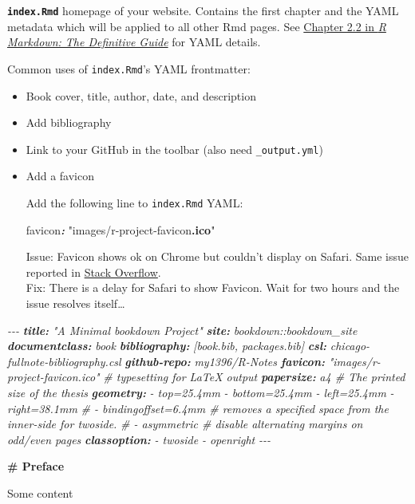 \documentclass[
  a4paper,
  twoside,
  openright]{book}
\newenvironment{Shaded}{\begin{snugshade}}{\end{snugshade}}
\newcommand{\AnnotationTok}[1]{\textcolor[rgb]{0.56,0.35,0.01}{\textbf{\textit{#1}}}}
\newcommand{\CommentTok}[1]{\textcolor[rgb]{0.56,0.35,0.01}{\textit{#1}}}
\newcommand{\FunctionTok}[1]{\textcolor[rgb]{0.13,0.29,0.53}{\textbf{#1}}}
\newcommand{\InformationTok}[1]{\textcolor[rgb]{0.56,0.35,0.01}{\textbf{\textit{#1}}}}
\newcommand{\NormalTok}[1]{#1}
\theoremstyle{definition}
\theoremstyle{definition}
\theoremstyle{definition}
\theoremstyle{definition}
\theoremstyle{remark}
\begin{document}
\textbf{\texttt{index.Rmd}} {homepage of your website}. Contains the first chapter and the YAML metadata which will be applied to all other Rmd pages. See \href{https://bookdown.org/yihui/rmarkdown/compile.html}{Chapter 2.2 in \emph{R Markdown: The Definitive Guide}} for YAML details.

Common uses of \texttt{index.Rmd}'s YAML frontmatter:

\begin{itemize}
\item
  Book cover, title, author, date, and description
\item
  Add bibliography
\item
  Link to your GitHub in the toolbar (also need \texttt{\_output.yml})
\item
  Add a favicon

  Add the following line to \texttt{index.Rmd} YAML:

\begin{Shaded}
\begin{Highlighting}[]
\NormalTok{favicon}\InformationTok{:}\NormalTok{ "images/r{-}project{-}favicon}\FunctionTok{.ico}\NormalTok{"}
\end{Highlighting}
\end{Shaded}

  Issue: Favicon shows ok on Chrome but couldn't display on Safari. Same issue reported in \href{https://stackoverflow.com/questions/66023588/r-bookdown-favicon-works-offline-but-not-online}{Stack Overflow}.\\
  Fix: There is a delay for Safari to show Favicon. Wait for two hours and the issue resolves itself\ldots{}
\end{itemize}

\begin{Shaded}
\begin{Highlighting}[]
\CommentTok{{-}{-}{-}}
\AnnotationTok{title:}\CommentTok{ "A Minimal bookdown Project"}
\AnnotationTok{site:}\CommentTok{ bookdown::bookdown\_site}
\AnnotationTok{documentclass:}\CommentTok{ book}
\AnnotationTok{bibliography:}\CommentTok{ [book.bib, packages.bib]}
\AnnotationTok{csl:}\CommentTok{ chicago{-}fullnote{-}bibliography.csl}
\AnnotationTok{github{-}repo:}\CommentTok{ my1396/R{-}Notes}
\AnnotationTok{favicon:}\CommentTok{ "images/r{-}project{-}favicon.ico"}
\CommentTok{\# typesetting for LaTeX output}
\AnnotationTok{papersize:}\CommentTok{ a4 \# The printed size of the thesis}
\AnnotationTok{geometry:}
\CommentTok{  {-} top=25.4mm}
\CommentTok{  {-} bottom=25.4mm}
\CommentTok{  {-} left=25.4mm}
\CommentTok{  {-} right=38.1mm}
\CommentTok{  \# {-} bindingoffset=6.4mm  \# removes a specified space from the inner{-}side for twoside.}
\CommentTok{  \# {-} asymmetric  \# disable alternating margins on odd/even pages}
\AnnotationTok{classoption:}\CommentTok{ }
\CommentTok{  {-} twoside}
\CommentTok{  {-} openright}
\CommentTok{{-}{-}{-}}

\FunctionTok{\# Preface}

\NormalTok{Some content}
\end{Highlighting}
\end{Shaded}
\end{document}
